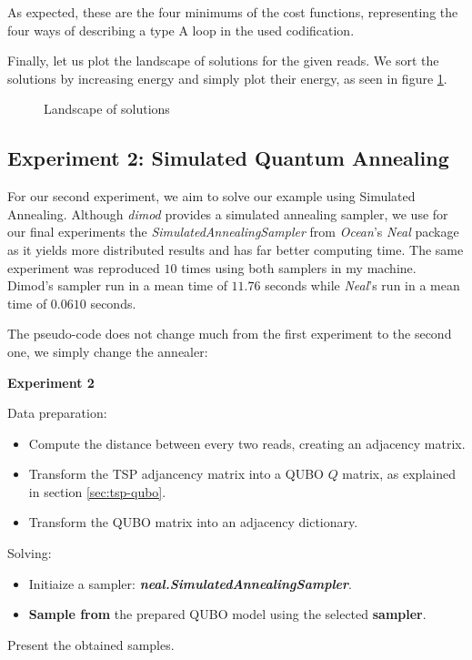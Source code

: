 As expected, these are the four minimums of the cost functions, representing the four ways of describing a type A loop in the used codification.

Finally, let us plot the landscape of solutions for the given reads. We sort the solutions by increasing energy and simply plot their energy, as seen in figure \ref{fig:exp1-landscape}.

\begin{figure}[H]
	\centering
	\caption{Landscape of solutions}
	\label{fig:exp1-landscape}
\end{figure}


\subsection{Experiment 2: Simulated Quantum Annealing}

For our second experiment, we aim to solve our example using Simulated Annealing. Although \emph{dimod} provides a simulated annealing sampler, we use for our final experiments the  \emph{SimulatedAnnealingSampler} from \emph{Ocean}'s \emph{Neal} package as it yields more distributed results and has far better computing time. The same experiment was reproduced $10$ times using both samplers in my machine. Dimod's sampler run in a mean time of $11.76$ seconds while \emph{Neal}'s run in a mean time of $0.0610$ seconds.

The pseudo-code does not change much from the first experiment to the second one, we simply change the annealer:

\begin{algorithm}
	\caption*{\textbf{Experiment 2}}
	
	Data preparation:
	\begin{itemize}
		\item Compute the distance between every two reads, creating an adjacency matrix.
		\item Transform the TSP adjancency matrix into a QUBO $Q$ matrix, as explained in section \ref{sec:tsp-qubo}.
		\item Transform the QUBO matrix into an adjacency dictionary.
	\end{itemize}
	
	Solving:
	\begin{itemize}
		\item Initiaize a sampler: \textbf{\emph{neal.SimulatedAnnealingSampler}}.
		\item \textbf{Sample from} the prepared QUBO model using the selected \textbf{sampler}.
	\end{itemize}
	
	Present the obtained samples.
\end{algorithm}

